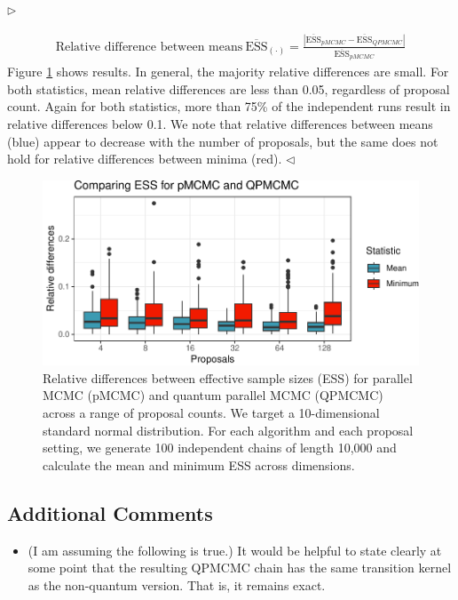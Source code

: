 \documentclass[12pt]{article}
\newenvironment{reply}{$\triangleright$\bfseries}{$\triangleleft$}
\renewenvironment{quote}
               {\list{}{\rightmargin\leftmargin}%
                \item\relax\normalfont}
               {\endlist}
\begin{document}
\begin{reply}
\begin{quote}
	\begin{align*}
		\mbox{Relative difference between means} \: \overline{\mbox{ESS}}_{(\cdot)} = \frac{\left|\overline{\mbox{ESS}}_{pMCMC} - \overline{\mbox{ESS}}_{QPMCMC}\right| }{\overline{\mbox{ESS}}_{pMCMC} }
	\end{align*}
	Figure \ref{fig:mixing} shows results.  In general, the majority relative differences are small.  For both statistics, mean relative differences are less than 0.05, regardless of proposal count.  Again for both statistics, more than 75\% of the independent runs result in relative differences below 0.1.  We note that relative differences between means (blue) appear to decrease with the number of proposals, but the same does not hold for relative differences between minima (red).
\end{quote}
\end{reply}

 \begin{figure}[!t]
	\centering
	\includegraphics[width=0.7\linewidth]{figures/pMCMCvsQPMCMC.pdf}
	\caption{Relative differences between effective sample sizes (ESS) for parallel MCMC (pMCMC) and quantum parallel MCMC (QPMCMC) across a range of proposal counts. We target a 10-dimensional standard normal distribution.  For each algorithm and each proposal setting, we generate 100 independent chains of length 10,000 and calculate the mean and minimum ESS across dimensions.}\label{fig:mixing} 
\end{figure}


\subsection*{Additional Comments}


\begin{itemize}
	\item (I am assuming the following is true.) It would be helpful to state clearly at some point that the resulting QPMCMC chain has the same transition kernel as the non-quantum version. That is, it remains exact.
\end{itemize}	
\end{document}

